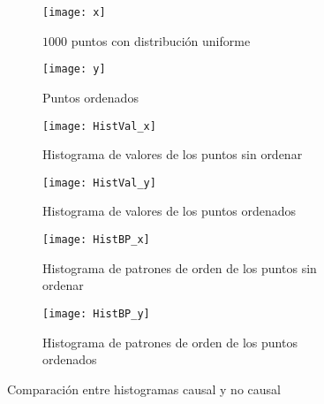 \begin{figure}[htpb]
	\centering
	\begin{subfigure}[t]{0.49\textwidth}
		\texttt{[image: x]}
		\caption{$1000$ puntos con distribución uniforme}
		\label{subfig:causal_nocausal_x}
	\end{subfigure}
	\begin{subfigure}[t]{0.49\textwidth}
		\texttt{[image: y]}
		\caption{Puntos ordenados}
		\label{subfig:causal_nocausal_y}
	\end{subfigure}
	\begin{subfigure}[t]{0.49\textwidth}
		\texttt{[image: HistVal\_x]}
		\caption{Histograma de valores de los puntos sin ordenar}
		\label{subfig:causal_nocausal_HistValx}
	\end{subfigure}
	\begin{subfigure}[t]{0.49\textwidth}
		\texttt{[image: HistVal\_y]}
		\caption{Histograma de valores de los puntos ordenados}
		\label{subfig:causal_nocausal_HistValy}
	\end{subfigure}
	\begin{subfigure}[t]{0.49\textwidth}
		\texttt{[image: HistBP\_x]}
		\caption{Histograma de patrones de orden de los puntos sin ordenar}
		\label{subfig:causal_nocausal_HistBPx}
	\end{subfigure}
	\begin{subfigure}[t]{0.49\textwidth}
		\texttt{[image: HistBP\_y]}
		\caption{Histograma de patrones de orden de los puntos ordenados}
		\label{subfig:causal_nocausal_HistBPy}
	\end{subfigure}
	\caption{Comparación entre histogramas causal y no causal}\label{fig:causal_nocausal}
\end{figure}

